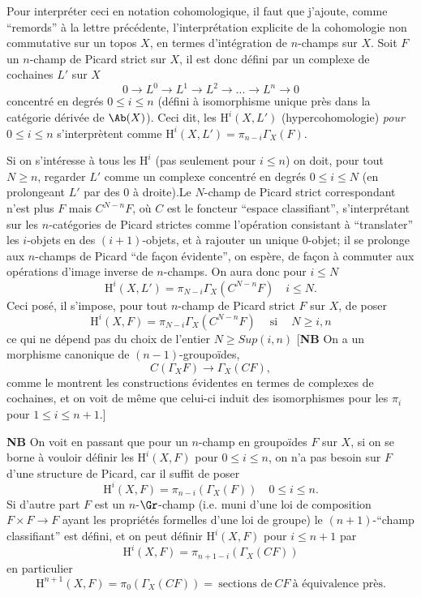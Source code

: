 Pour interpréter ceci en notation cohomologique, il faut que j'ajoute, comme ``remords'' à la lettre précédente, l'interprétation explicite de la cohomologie non commutative sur un topos $X$, en termes d'intégration de $n$-champs sur $X$. Soit $F$ un $n$-champ de Picard strict sur $X$, il est donc défini par un complexe de cochaines $L'$ sur $X$
$$
0 \to L^0 \to L^1 \to L^2 \to ... \to L^n \to 0
$$
concentré en degrés $0 \leq i \leq n$ (défini à isomorphisme unique près dans la catégorie dérivée de $\Ab(X)$). Ceci dit, les $\mathrm H^i(X, L')$ (hypercohomologie) \emph{pour $0 \leq i \leq n$} s'interprètent comme $\mathrm H^i(X, L') = \pi_{n-i}\Gamma_X(F)$.

Si on s'intéresse à tous les $\mathrm H^i$ (pas seulement pour $i \leq n$) on doit, pour tout $N \geq n$, regarder $L'$ comme un complexe concentré en degrés $0 \leq i \leq N$ (en prolongeant $L'$ par des $0$ à droite).Le $N$-champ de Picard strict correspondant n'est plus $F$ mais $C^{N-n}F$, où $C$ est le foncteur ``espace classifiant'', s'interprétant sur les $n$-catégories de Picard strictes comme l'opération consistant à ``translater'' les $i$-objets en des $(i+1)$-objets, et à rajouter un unique $0$-objet; il se prolonge aux $n$-champs de Picard ``de fa\c{c}on évidente'', on espère, de fa\c{c}on à commuter aux opérations d'image inverse de $n$-champs. On aura donc pour $i \leq N$
$$
\mathrm H^i(X, L') = \pi_{N-i}\Gamma_X(C^{N-n}F) \quad i \leq N.
$$
Ceci posé, il s'impose, pour tout $n$-champ de Picard strict $F$ sur $X$, de poser 
$$
\boxed{
\mathrm H^i(X, F) = \pi_{N-i}\Gamma_X(C^{N-n}F) \quad~\text{si}~\quad N \geq i,n
}
$$
ce qui ne dépend pas du choix de l'entier $N \geq Sup(i, n)$ [{\textbf{NB}} On a un morphisme canonique de $(n-1)$-groupoïdes,
$$
C(\Gamma_X F) \to \Gamma_X(C F),
$$
comme le montrent les constructions évidentes en termes de complexes de cochaines, et on voit de même que celui-ci induit des isomorphismes pour les $\pi_i$ pour $1 \leq i \leq n+1$.]

{\textbf{NB}} On voit en passant que pour un $n$-champ en groupoïdes $F$ sur $X$, si on se borne à vouloir définir les $\mathrm H^i(X, F)$ pour $0 \leq i \leq n$, on n'a pas besoin sur $F$ d'une structure de Picard, car il suffit de poser
$$
\mathrm H^i(X, F) = \pi_{n-i}(\Gamma_X(F)) \quad 0 \leq i \leq n.
$$
Si d'autre part $F$ est un $n$-$\Gr$-champ (i.e. muni d'une loi de composition $F \times F \to F$ ayant les propriétés formelles d'une loi de groupe) le $(n+1)$-``champ classifiant'' est défini, et on peut définir $\mathrm H^i(X, F)$ pour $i \leq n+1$ par
$$
\mathrm H^i(X, F) = \pi_{n+1-i}(\Gamma_X(CF))
$$
en particulier
$$
\mathrm H^{n+1}(X, F) = \pi_0(\Gamma_X(CF)) =~\text{sections de}~CF~\text{à équivalence près}.
$$

